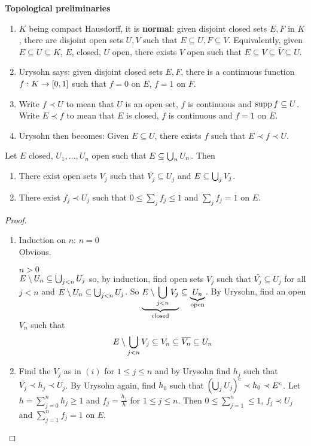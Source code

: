 \documentclass{article}
\begin{document}
{\bf Topological preliminaries}
\begin{enumerate}
  \item $K$ being compact Hausdorff, it is {\bf normal}: given disjoint closed sets $E, F$ in $K$, there are disjoint open sets $U, V$ such that $E \subseteq U, F \subseteq V$. Equivalently, given $E \subseteq U \subseteq K$, $E$, closed, $U$ open, there exists $V$ open such that $E \subseteq V \subseteq \bar V \subseteq U$.
  \item Urysohn says: given disjoint closed sets $E, F$, there is a continuous function $f : K \rightarrow [0, 1]$ such that $f = 0$ on $E$, $f = 1$ on $F$.
  \item Write $f \prec U$ to mean that $U$ is an open set, $f$ is continuous and $\operatorname{supp} f \subseteq U$. Write $E \prec f$ to mean that $E$ is closed, $f$ is continuous and $f = 1$ on $E$.
  \item Urysohn then becomes: Given $E \subseteq U$, there exists $f$ such that $E \prec f \prec U$.
\end{enumerate}

\begin{nlemma}\label{lem:partition-of-unity}
  Let $E$ closed, $U_1, \dots, U_n$ open such that $E \subseteq \bigcup_n U_n$. Then
  \begin{enumerate}
    \item There exist open sets $V_j$ such that $\bar{V_j} \subseteq U_j$ and $E \subseteq \bigcup_j V_j$.
    \item There exist $f_j \prec U_j$ such that $0 \le \sum_j f_j \le 1$ and $\sum_j f_j = 1$ on $E$.
  \end{enumerate}
\end{nlemma}
\begin{proof}~
  \begin{enumerate}
    \item Induction on $n$:
    {\bf $n = 0$} \\
    Obvious.

    {\bf $n > 0$} \\
    $E \setminus U_n \subseteq \bigcup_{j < n} U_j$ so, by induction, find open sets $V_j$ such that $\bar{V_j} \subseteq U_j$ for all $j < n$ and $E \setminus U_n \subseteq \bigcup_{j < n} U_j$. So $\underbrace{E \setminus \bigcup_{j < n} V_j}_{\text{closed}} \subseteq \underbrace{U_n}_{\text{open}}$. By Urysohn, find an open $V_n$ such that
    $$E \setminus \bigcup_{j < n} V_j \subseteq V_n \subseteq \overline{V_n} \subseteq U_n$$
    \item Find the $V_j$ as in $(i)$ for $1 \le j \le n$ and by Urysohn find $h_j$ such that $\bar{V_j} \prec h_j \prec U_j$. By Urysohn again, find $h_0$ such that $\left(\bigcup_j U_j\right)^c \prec h_0 \prec E^c$. Let $h = \sum_{j = 0}^n h_j \ge 1$ and $f_j = \frac{h_j}h$ for $1 \le j \le n$. Then $0 \le \sum_{j = 1}^n \le 1$, $f_j \prec U_j$ and $\sum_{j = 1}^n f_j = 1$ on $E$.
  \end{enumerate}
\end{proof}
\end{document}
